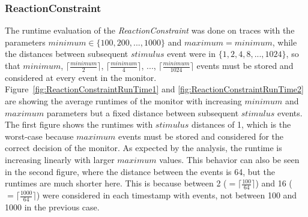 \subsubsection{ReactionConstraint}
The runtime evaluation of the \textit{ReactionConstraint} was done on traces with the parameters $minimum\in\{100,200,...,1000\}$ and $maximum = minimum$, while the distances between subsequent $stimulus$ event were in $\{1, 2, 4, 8, ..., 1024\}$, so that $minimum$, $\lceil\frac{minimum}{2}\rceil$,  $\lceil\frac{minimum}{4}\rceil$, ...,  $\lceil\frac{minimum}{1024}\rceil$ events must be stored and considered at every event in the monitor.\\
Figure~\ref{fig:ReactionConstraintRunTime1} and \ref{fig:ReactionConstraintRunTime2} are showing the average runtimes of the monitor with increasing $minimum$ and $maximum$ parameters but a fixed distance between subsequent $stimulus$ events. The first figure shows the runtimes with $stimulus$ distances of 1, which is the worst-case because $maximum$ events must be stored and considered for the correct decision of the monitor. As expected by the analysis, the runtime is increasing linearly with larger $maximum$ values. This behavior can also be seen in the second figure, where the distance between the events is 64, but the runtimes are much shorter here. This is because between 2 ($=\lceil \frac{100}{64}\rceil$) and 16 ($=\lceil \frac{1000}{64}\rceil$) were considered in each timestamp with events, not between 100 and 1000 in the previous case.
